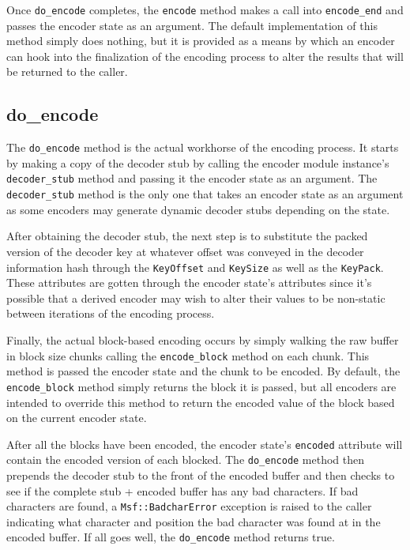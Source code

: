 \documentclass{report}
\begin{document}
\par
Once \texttt{do\_encode} completes, the \texttt{encode} method makes
a call into \texttt{encode\_end} and passes the encoder state as an
argument.  The default implementation of this method simply does
nothing, but it is provided as a means by which an encoder can hook
into the finalization of the encoding process to alter the results
that will be returned to the caller.

        \subsection{do\_encode}

\par
The \texttt{do\_encode} method is the actual workhorse of the
encoding process.  It starts by making a copy of the decoder stub by
calling the encoder module instance's \texttt{decoder\_stub} method
and passing it the encoder state as an argument.  The
\texttt{decoder\_stub} method is the only one that takes an encoder
state as an argument as some encoders may generate dynamic decoder
stubs depending on the state.

\par
After obtaining the decoder stub, the next step is to substitute the
packed version of the decoder key at whatever offset was conveyed in
the decoder information hash through the \texttt{KeyOffset} and
\texttt{KeySize} as well as the \texttt{KeyPack}.  These attributes
are gotten through the encoder state's attributes since it's
possible that a derived encoder may wish to alter their values to be
non-static between iterations of the encoding process.

\par
Finally, the actual block-based encoding occurs by simply walking
the raw buffer in block size chunks calling the
\texttt{encode\_block} method on each chunk.  This method is passed
the encoder state and the chunk to be encoded.  By default, the
\texttt{encode\_block} method simply returns the block it is passed,
but all encoders are intended to override this method to return the
encoded value of the block based on the current encoder state.

\par
After all the blocks have been encoded, the encoder state's
\texttt{encoded} attribute will contain the encoded version of each
blocked.  The \texttt{do\_encode} method then prepends the decoder
stub to the front of the encoded buffer and then checks to see if
the complete stub + encoded buffer has any bad characters.  If bad
characters are found, a \texttt{Msf::BadcharError} exception is
raised to the caller indicating what character and position the bad
character was found at in the encoded buffer.  If all goes well, the
\texttt{do\_encode} method returns true.
\end{document}

